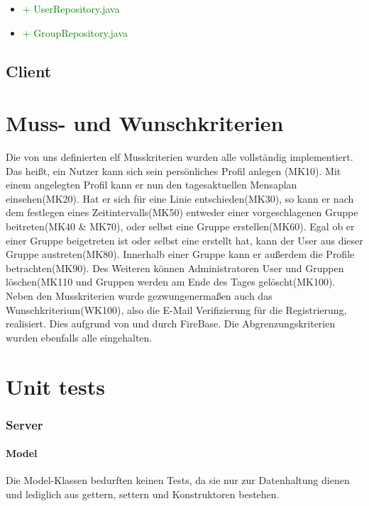 \documentclass[a4paper]{scrreprt}
\begin{document}
\begin{itemize}
\item\textcolor{green}{+ UserRepository.java}
\item\textcolor{green}{+ GroupRepository.java}
\end{itemize}


\section{Client}

\chapter{Muss- und Wunschkriterien}
Die von uns definierten elf Musskriterien wurden alle vollständig implementiert. Das heißt, ein Nutzer kann sich sein persönliches Profil anlegen (\Gls{MK10}). Mit einem angelegten Profil kann er nun den tagesaktuellen Mensaplan einsehen(\Gls{MK20}). Hat er sich für eine Linie entschieden(\Gls{MK30}), so kann er nach dem festlegen eines Zeitintervalls(\Gls{MK50}) entweder einer vorgeschlagenen Gruppe beitreten(\Gls{MK40} \& \Gls{MK70}), oder selbst eine Gruppe erstellen(\Gls{MK60}). Egal ob er einer Gruppe beigetreten ist oder selbst eine erstellt hat, kann der User aus dieser Gruppe austreten(\Gls{MK80}). Innerhalb einer Gruppe kann er außerdem die Profile betrachten(\Gls{MK90}). Des Weiteren können Administratoren User und Gruppen löschen(\Gls{MK110} und Gruppen werden am Ende des Tages gelöscht(\Gls{MK100}).
Neben den Musskriterien wurde gezwungenermaßen auch das Wunschkriterium(\Gls{WK100}), also die E-Mail Verifizierung für die Registrierung, realisiert. Dies aufgrund von und durch FireBase. Die Abgrenzungskriterien wurden ebenfalls alle eingehalten.


\chapter{Unit tests}
\subsection{Server}

\subsubsection{Model}
Die Model-Klassen bedurften keinen Tests, da sie nur zur Datenhaltung dienen und lediglich aus gettern, settern und Konstruktoren bestehen.
\end{document}
